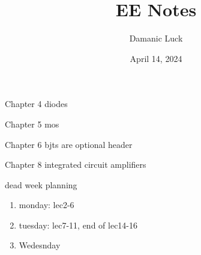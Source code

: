 \documentclass[10pt, openany]{book}
\title{EE Notes}
\author{Damanic Luck}
\date{April 14, 2024}
\begin{document}
\maketitle

\setcounter{chapter}{1}
\tableofcontents


\newpage
\begin{todo}
    \item Chapter 4 diodes
    \item Chapter 5 mos
    \item Chapter 6 bjts are optional header
    \item Chapter 8 integrated circuit amplifiers
    \item dead week planning
    \begin{enumerate}
        \item monday: lec2-6
        \item tuesday: lec7-11, end of lec14-16
        \item Wedesnday
    \end{enumerate}
\end{todo}


\newpage


\newpage

\end{document}
